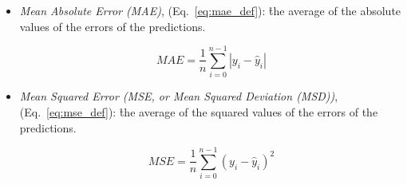 
\begin{itemize}[noitemsep,topsep=0pt]
\item \textit{Mean Absolute Error (MAE)}, (Eq.~\ref{eq:mae_def}): \r{the average of the absolute values of the errors of the predictions}.
	
\begin{equation}
{MAE = \frac{1}{n}\sum_{i=0}^{n-1}|y_i - \hat{y}_i| }
\label{eq:mae_def}
\end{equation}
	
\item \textit{Mean Squared Error (MSE, or Mean Squared Deviation (MSD))}, (Eq.~\ref{eq:mse_def}): \r{the average of the squared values of the errors of the predictions}.
	
\begin{equation}
{MSE = \frac{1}{n}\sum_{i=0}^{n-1}(y_i - \hat{y}_i)^2}
\label{eq:mse_def}
\end{equation}
	
\end{itemize}

